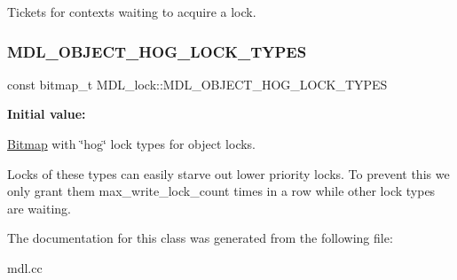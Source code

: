 Tickets for contexts waiting to acquire a lock. \mbox{\label{classMDL__lock_abaeb101565637f92f74d4a84bdc53fa5}} 
\subsubsection{\texorpdfstring{M\+D\+L\+\_\+\+O\+B\+J\+E\+C\+T\+\_\+\+H\+O\+G\+\_\+\+L\+O\+C\+K\+\_\+\+T\+Y\+P\+ES}{MDL\_OBJECT\_HOG\_LOCK\_TYPES}}
{\footnotesize\ttfamily const bitmap\+\_\+t M\+D\+L\+\_\+lock\+::\+M\+D\+L\+\_\+\+O\+B\+J\+E\+C\+T\+\_\+\+H\+O\+G\+\_\+\+L\+O\+C\+K\+\_\+\+T\+Y\+P\+ES\hspace{0.3cm}{\ttfamily [static]}}

{\bfseries Initial value\+:}
\begin{DoxyCode}{0}
\DoxyCodeLine{=}
\end{DoxyCode}
\mbox{\hyperlink{classBitmap}{Bitmap}} with \char`\"{}hog\char`\"{} lock types for object locks.

Locks of these types can easily starve out lower priority locks. To prevent this we only grant them max\+\_\+write\+\_\+lock\+\_\+count times in a row while other lock types are waiting. 

The documentation for this class was generated from the following file\+:\begin{DoxyCompactItemize}
\item 
mdl.\+cc\end{DoxyCompactItemize}
